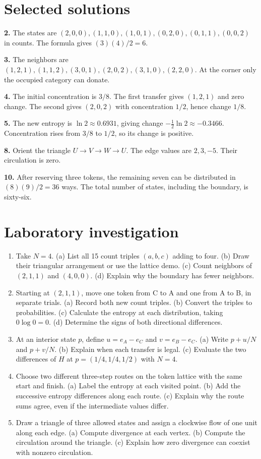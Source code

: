 \documentclass[11pt,oneside,openany]{book}
\theoremstyle{definition}
\theoremstyle{remark}
\numberwithin{equation}{chapter}
\providecommand{\tightlist}{\setlength{\itemsep}{0pt}\setlength{\parskip}{0pt}}
\newcommand{\labheading}{\FloatBarrier\section*{Laboratory investigation}\addcontentsline{toc}{section}{Laboratory investigation}}
\begin{document}
\section{Selected solutions}\label{ch03-selected-solutions}

\textbf{2.} The states are \((2,0,0),(1,1,0),(1,0,1),(0,2,0),(0,1,1),(0,0,2)\) in counts. The formula gives \((3)(4)/2=6\).

\textbf{3.} The neighbors are \((1,2,1),(1,1,2),(3,0,1),(2,0,2),(3,1,0),(2,2,0)\). At the corner only the occupied category can donate.

\textbf{4.} The initial concentration is \(3/8\). The first transfer gives \((1,2,1)\) and zero change. The second gives \((2,0,2)\) with concentration \(1/2\), hence change \(1/8\).

\textbf{5.} The new entropy is \(\ln2\approx0.6931\), giving change \(-\tfrac12\ln2\approx-0.3466\). Concentration rises from \(3/8\) to \(1/2\), so its change is positive.

\textbf{8.} Orient the triangle \(U\to V\to W\to U\). The edge values are \(2,3,-5\). Their circulation is zero.

\textbf{10.} After reserving three tokens, the remaining seven can be distributed in \((8)(9)/2=36\) ways. The total number of states, including the boundary, is sixty-six.
\labheading\begin{enumerate}
\def\labelenumi{\arabic{enumi}.}
\tightlist
\item
  Take \(N=4\). (a) List all 15 count triples \((a,b,c)\) adding to four. (b) Draw their triangular arrangement or use the lattice demo. (c) Count neighbors of \((2,1,1)\) and \((4,0,0)\). (d) Explain why the boundary has fewer neighbors.
\item
  Starting at \((2,1,1)\), move one token from C to A and one from A to B, in separate trials. (a) Record both new count triples. (b) Convert the triples to probabilities. (c) Calculate the entropy at each distribution, taking \(0\log0=0\). (d) Determine the signs of both directional differences.
\item
  At an interior state \(p\), define \(u=e_A-e_C\) and \(v=e_B-e_C\). (a) Write \(p+u/N\) and \(p+v/N\). (b) Explain when each transfer is legal. (c) Evaluate the two differences of \(H\) at \(p=(1/4,1/4,1/2)\) with \(N=4\).
\item
  Choose two different three-step routes on the token lattice with the same start and finish. (a) Label the entropy at each visited point. (b) Add the successive entropy differences along each route. (c) Explain why the route sums agree, even if the intermediate values differ.
\item
  Draw a triangle of three allowed states and assign a clockwise flow of one unit along each edge. (a) Compute divergence at each vertex. (b) Compute the circulation around the triangle. (c) Explain how zero divergence can coexist with nonzero circulation.
\end{enumerate}

\FloatBarrier
\end{document}

